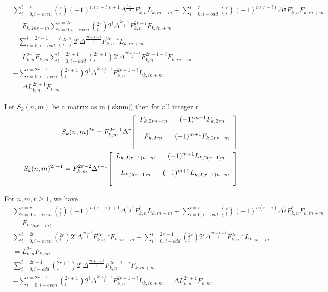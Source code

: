 \begin{align*}
&\sum_{i=0,i-even}^{i=r}\left(^{r} _{i}\right)(-1)^{n(r-i)+1}\Delta^{\frac{i-1}{2}}F_{k,n}^{i}L_{k,in+m}+\sum_{i=0,i-odd}^{i=r}\left(^{r}_{i}\right)(-1)^{n(r-i)}\Delta^{\frac{i}{2}}F_{k,n}^{i}F_{k,in+m}\\
&=F_{k,2nr+m}\sum_{i=0,i-even}^{i=2r}\left(^{2r} _{i}\right)2^i\Delta^{\frac{2r-i}{2}}F_{k,n}^{2r-i}F_{k,in+m}\\&-\sum_{i=0,i-odd}^{i=2r-1}\left(^{2r}_{i}\right)2^i\Delta^{\frac{2r-1-i}{2}}F_{k,n}^{2r-i}L_{k,in+m}\\
&=L_{k,n}^{2r}F_{k,m}\sum_{i=0,i-odd}^{i=2r+1}\left(^{2r+1} _{i}\right)2^i\Delta^{\frac{2r+3-i}{2}}F_{k,n}^{2r+1-i}F_{k,in+m}\\&-\sum_{i=0,i-even}^{i=2r-1}\left(^{2r+1}_{i}\right)2^i\Delta^{\frac{2r+2-i}{2}}F_{k,n}^{2r+1-i}L_{k,in+m}\\
&=\Delta L_{k,n}^{2r+1}F_{k,m}.
\end{align*}
\begin{theorem} Let $S_{k}(n,m)$ be a matrix as in (\ref{sknm}) then for all integer $r$ 
\begin{align*}
S_{k}(n,m)^{2r} = F_{k,m}^{2r-1}\Delta^r{\left[
          \begin{array}{cc}
           \bigskip
            F_{k,2rn+m} & (-1)^{m+1}F_{k,2rn} \\
             \bigskip
            F_{k,2rn} & (-1)^{m+1}F_{k,2rn-m} \\
          \end{array}
        \right]}\\
  S_{k}(n,m)^{2r-1} = F_{k,m}^{2r-2}\Delta^{r-1}{\left[
          \begin{array}{cc}
           \bigskip
            L_{k,2(r-1)n+m} & (-1)^{m+1}L_{k,2(r-1)n} \\
             \bigskip
            L_{k,2(r-1)n} & (-1)^{m+1}L_{k,2(r-1)n-m} \\
          \end{array}
        \right]}
\end{align*}
\end{theorem}
\begin{theorem}
For $n, m, r \geq 1 $, we have
\begin{align*}
&\sum_{i=0,i-even}^{i=r}\left(^{r} _{i}\right)(-1)^{n(r-i)+1}\Delta^{\frac{i-1}{2}}F_{k,n}^{i}L_{k,in+m}+\sum_{i=0,i-odd}^{i=r}\left(^{r}_{i}\right)(-1)^{n(r-i)}\Delta^{\frac{i}{2}}F_{k,n}^{i}F_{k,in+m}\\&= F_{k,2nr+m},\\	
&\sum_{i=0,i-even}^{i=2r}\left(^{2r} _{i}\right)2^i\Delta^{\frac{2r-i}{2}}F_{k,n}^{2r-i}F_{k,in+m}-\sum_{i=0,i-odd}^{i=2r-1}\left(^{2r}_{i}\right)2^i\Delta^{\frac{2r-1-i}{2}}F_{k,n}^{2r-i}L_{k,in+m}\\&= L_{k,n}^{2r}F_{k,m},\\
&\sum_{i=0,i-odd}^{i=2r+1}\left(^{2r+1} _{i}\right)2^i\Delta^{\frac{2r+3-i}{2}}F_{k,n}^{2r+1-i}F_{k,in+m}\\&-\sum_{i=0,i-even}^{i=2r-1}\left(^{2r+1}_{i}\right)2^i\Delta^{\frac{2r+2-i}{2}}F_{k,n}^{2r+1-i}L_{k,in+m} = \Delta L_{k,n}^{2r+1}F_{k,m}.	
\end{align*}	
\end{theorem}
